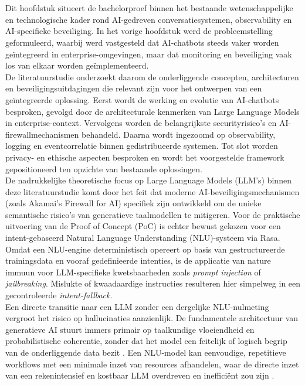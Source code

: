 \chapter{}%
\label{ch:stand-van-zaken}

Dit hoofdstuk situeert de bachelorproef binnen het bestaande wetenschappelijke en technologische kader rond AI-gedreven conversatiesystemen, observability en AI-specifieke beveiliging. In het vorige hoofdstuk werd de probleemstelling geformuleerd, waarbij werd vastgesteld dat AI-chatbots steeds vaker worden geïntegreerd in enterprise-omgevingen, maar dat monitoring en beveiliging vaak los van elkaar worden geïmplementeerd. \\

De literatuurstudie onderzoekt daarom de onderliggende concepten, architecturen en beveiligingsuitdagingen die relevant zijn voor het ontwerpen van een geïntegreerde oplossing. Eerst wordt de werking en evolutie van AI-chatbots besproken, gevolgd door de architecturale kenmerken van Large Language Models in enterprise-context. Vervolgens worden de belangrijkste securityrisico’s en AI-firewall\-mechanismen behandeld. Daarna wordt ingezoomd op observability, logging en eventcorrelatie binnen gedistribueerde systemen. Tot slot worden privacy- en ethische aspecten besproken en wordt het voorgestelde framework gepositioneerd ten opzichte van bestaande oplossingen.\\

De nadrukkelijke theoretische focus op Large Language Models (LLM’s) binnen deze literatuurstudie komt door het feit dat moderne AI-beveiligingsmechanismen (zoals Akamai’s Firewall for AI) specifiek zijn ontwikkeld om de unieke semantische risico's van generatieve taalmodellen te mitigeren. Voor de praktische uitvoering van de Proof of Concept (PoC) is echter bewust gekozen voor een intent-gebaseerd Natural Language Understanding (NLU)-systeem via Rasa. Omdat een NLU-engine deterministisch opereert op basis van gestructureerde trainingsdata en vooraf gedefinieerde intenties, is de applicatie van nature immuun voor LLM-specifieke kwetsbaarheden zoals \textit{prompt injection} of \textit{jailbreaking}. Mislukte of kwaadaardige instructies resulteren hier simpelweg in een gecontroleerde \textit{intent-fallback}. \\

Een directe transitie naar een LLM zonder een dergelijke NLU-nulmeting vergroot het risico op hallucinaties aanzienlijk. De fundamentele architectuur van generatieve AI stuurt immers primair op taalkundige vloeiendheid en probabilistische coherentie, zonder dat het model een feitelijk of logisch begrip van de onderliggende data bezit \autocite{bender2021dangers}. Een NLU-model kan eenvoudige, repetitieve workflows met een minimale inzet van resources afhandelen, waar de directe inzet van een rekenintensief en kostbaar LLM overdreven en inefficiënt zou zijn \autocite{ijfmr2024intent}.

